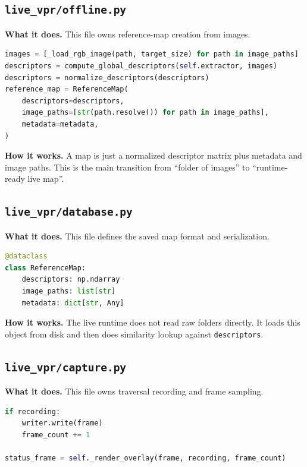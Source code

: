 \documentclass[11pt]{article}
\newcommand{\file}[1]{\texttt{#1}}
\begin{document}
\subsection{\file{live\_vpr/offline.py}}
\textbf{What it does.} This file owns reference-map creation from images.

\begin{lstlisting}[style=repo, language=Python, caption={Core map-building loop}]
images = [_load_rgb_image(path, target_size) for path in image_paths]
descriptors = compute_global_descriptors(self.extractor, images)
descriptors = normalize_descriptors(descriptors)
reference_map = ReferenceMap(
    descriptors=descriptors,
    image_paths=[str(path.resolve()) for path in image_paths],
    metadata=metadata,
)
\end{lstlisting}

\textbf{How it works.} A map is just a normalized descriptor matrix plus metadata and image paths. This is the main transition from ``folder of images'' to ``runtime-ready live map''.

\subsection{\file{live\_vpr/database.py}}
\textbf{What it does.} This file defines the saved map format and serialization.

\begin{lstlisting}[style=repo, language=Python, caption={ReferenceMap is the live system's central data object}]
@dataclass
class ReferenceMap:
    descriptors: np.ndarray
    image_paths: list[str]
    metadata: dict[str, Any]
\end{lstlisting}

\textbf{How it works.} The live runtime does not read raw folders directly. It loads this object from disk and then does similarity lookup against \texttt{descriptors}.

\subsection{\file{live\_vpr/capture.py}}
\textbf{What it does.} This file owns traversal recording and frame sampling.

\begin{lstlisting}[style=repo, language=Python, caption={Recording first, building later}]
if recording:
    writer.write(frame)
    frame_count += 1

status_frame = self._render_overlay(frame, recording, frame_count)
\end{lstlisting}
\end{document}
